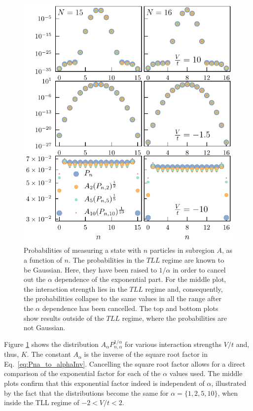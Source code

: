 \begin{figure}[h!]
\begin{center}
\includegraphics[scale=1.1]{alphaCollapse.pdf}
\end{center}
\caption{Probabilities of measuring a state with $n$ particles in subregion $A$, as  a function of $n$. The probabilities in the $TLL$ regime are known to be Gaussian. Here, they have been raised to $1/\alpha$ in order to cancel out the $\alpha$ dependence of the exponential part. For the middle plot, the interaction strength lies in the $TLL$ regime and, consequently, the probabilities collapse to the same values in all the range after the $\alpha$ dependence has been cancelled. The top and bottom plots show results outside of the $TLL$ regime, where the probabilities are not Gaussian.}
\label{fig:alpha_collapse}
\end{figure}
 
 Figure \ref{fig:alpha_collapse} shows the distribution $A_{\alpha} P_{n,\alpha}^{1/\alpha}$ for various interaction strengths $V/t$ and, thus, $K$. The constant $A_{\alpha}$ is the inverse of the square root factor in Eq.~\eqref{eq:Pna_to_alphaInv}. Cancelling the square root factor allows for a direct comparison of the exponential factor for each of the $\alpha$ values used. The middle plots confirm that this exponential factor indeed is independent of $\alpha$, illustrated by the fact that the distributions become the same for $\alpha=\{1,2,5,10\}$, when inside the TLL regime of $-2 < V/t < 2$.
 
